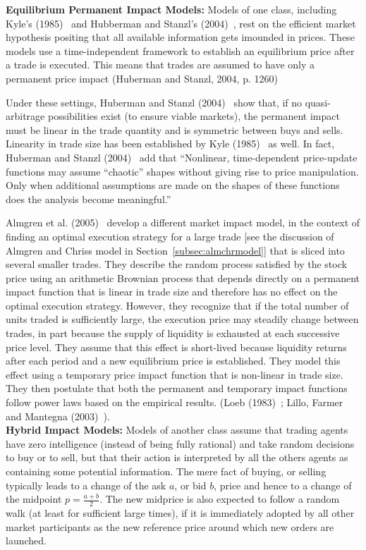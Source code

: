\noindent \textbf{Equilibrium Permanent Impact Models:} Models of one class, including Kyle's (1985)~\cite{kyle1985} and Hubberman and Stanzl's (2004)~\cite{huberstan}, rest on the efficient market hypothesis positing that all available information gets imounded in prices. These models use a time-independent framework to establish an equilibrium price after a trade is executed. This means that trades are assumed to have only a permanent price impact (Huberman and Stanzl, 2004, p. 1260)~\cite{huberstan}


Under these settings, Huberman and Stanzl (2004)~\cite{huberstan} show that, if no quasi-arbitrage possibilities exist (to ensure viable markets), the permanent impact must be linear in the trade quantity and is symmetric between buys and sells. Linearity in trade size has been established by Kyle (1985)~\cite{kyle1985} as well. In fact, Huberman and Stanzl (2004)~\cite{huberstan} add that ``Nonlinear, time-dependent price-update functions may assume ``chaotic'' shapes without giving rise to price manipulation. Only when additional assumptions are made on the shapes of these functions does the analysis become meaningful.''


Almgren et al. (2005)~\cite{athl} develop a different market impact model, in the context of finding an optimal execution strategy for a large trade [see the discussion of Almgren and Chriss model in Section~\ref{subsec:almchrmodel}] that is sliced into several smaller trades. They describe the random process satisfied by the stock price using an arithmetic Brownian process that depends directly on a permanent impact function that is linear in trade size and therefore has no effect on the optimal execution strategy. However, they recognize that if the total number of units traded is sufficiently large, the execution price may steadily change between trades, in part because the supply of liquidity is exhausted at each successive price level. They assume that this effect is short-lived because liquidity returns after each period and a new equilibrium price is established. They model this effect using a temporary price impact function that is non-linear in trade size. They then postulate that both the permanent and temporary impact functions follow power laws based on the empirical results. (Loeb (1983)~\cite{loeb}; Lillo, Farmer and Mantegna (2003)~\cite{farmermantegna}). \\


\noindent \textbf{Hybrid Impact Models:} Models of another class assume that trading agents have zero intelligence (instead of being fully rational) and take random decisions to buy or to sell, but that their action is interpreted by all the others agents as containing some potential information. The mere fact of buying, or selling typically leads to a change of the ask $a$, or bid $b$, price and hence to a change of the midpoint $p=\frac{a+b}{2}$. The new midprice is also expected to follow a random walk (at least for sufficient large times), if it is immediately adopted by all other market participants as the new reference price around which new orders are launched.


